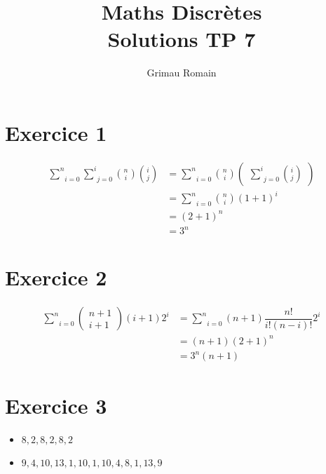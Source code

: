 \documentclass{article}
\title{\textbf{Maths Discrètes}\\ Solutions TP 7}
\author{Grimau Romain}
\date{}
\begin{document}
\maketitle %


\section*{Exercice 1}
\begin{align*}
\underset{i=0}{\overset{n}{\sum}}\underset{j=0}{\overset{i}{\sum}}\binom{n}{i}\binom{i}{j} &=
\underset{i=0}{\overset{n}{\sum}}\binom{n}{i}
\begin{pmatrix}
\underset{j=0}{\overset{i}{\sum}}\binom{i}{j}
\end{pmatrix} \\ &=
\underset{i=0}{\overset{n}{\sum}}\binom{n}{i} (1+1)^{i} \\&=
(2+1)^{n} \\ &=
3^{n}
\end{align*}

\section*{Exercice 2}
\begin{align*}
\underset{i=0}{\overset{n}{\sum}}
\begin{pmatrix}
n+1 \\
i+1
\end{pmatrix}
(i+1)2^{i} &=
\underset{i=0}{\overset{n}{\sum}}(n+1)\dfrac{n!}{i!(n-i)!}2^{i} \\ &=
(n+1)(2+1)^{n} \\ &=
3^{n}(n+1)
\end{align*}

\section*{Exercice 3}
\begin{itemize}
\item $8, 2, 8, 2, 8, 2$ 
\item $9, 4, 10, 13, 1, 10, 1, 10, 4, 8, 1, 13, 9$
\end{itemize}
\end{document}
